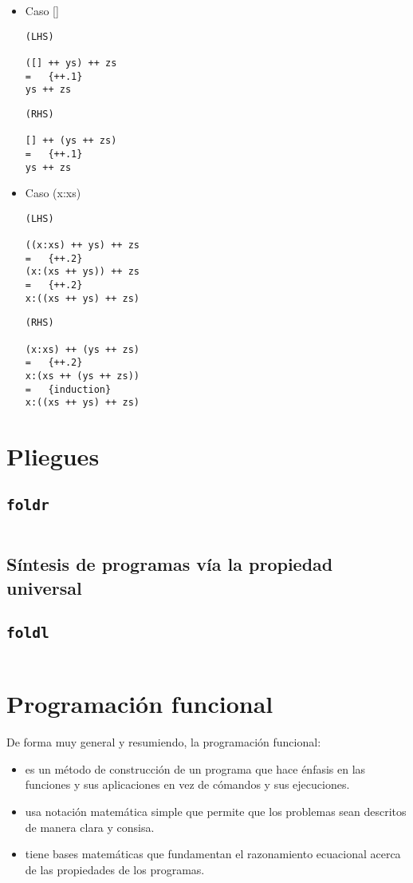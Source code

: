 \begin{itemize}
\item Caso []
\begin{verbatim}
(LHS)

([] ++ ys) ++ zs
=   {++.1}
ys ++ zs
\end{verbatim}

\begin{verbatim}
(RHS)

[] ++ (ys ++ zs)
=   {++.1}
ys ++ zs
\end{verbatim}

\item Caso (x:xs)
\begin{verbatim}
(LHS)

((x:xs) ++ ys) ++ zs
=   {++.2}
(x:(xs ++ ys)) ++ zs
=   {++.2}
x:((xs ++ ys) ++ zs)
\end{verbatim}

\begin{verbatim}
(RHS)

(x:xs) ++ (ys ++ zs)
=   {++.2}
x:(xs ++ (ys ++ zs))
=   {induction}
x:((xs ++ ys) ++ zs)
\end{verbatim}

\end{itemize}

\section{Pliegues}

\subsection{\texttt{foldr}}
\inputminted{haskell}{definiciones/foldr.hs}

\subsection{Síntesis de programas vía la propiedad universal}


\subsection{\texttt{foldl}}
\inputminted{haskell}{definiciones/foldl.hs}



\section{Programación funcional}
De forma muy general y resumiendo, la programación funcional:
\begin{itemize}
    \item es un método de construcción de un programa que hace énfasis en las funciones y sus aplicaciones
    en vez de cómandos y sus ejecuciones.

    \item usa notación matemática simple que permite que los problemas sean descritos de manera clara
    y consisa.
    \item tiene bases matemáticas que fundamentan el razonamiento ecuacional acerca de las propiedades de
    los programas.
\end{itemize}

